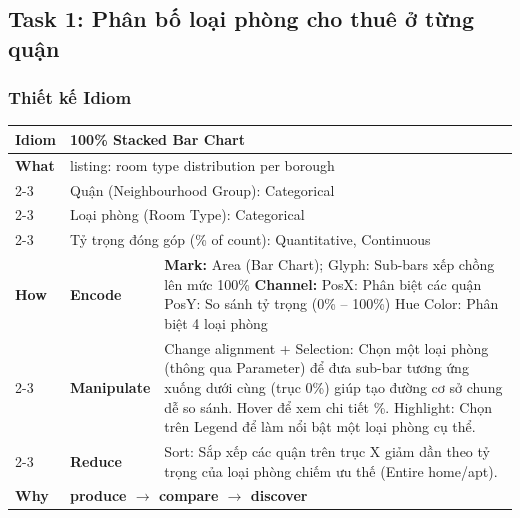\subsection{Task 1: Phân bố loại phòng cho thuê ở từng quận}

\subsubsection{Thiết kế Idiom}

\begin{table}[H]
\centering
\renewcommand{\arraystretch}{1.1}
\begin{tabularx}{\textwidth}{|l|l|X|}
\hline
\textbf{Idiom} & \multicolumn{2}{l|}{\textbf{100\% Stacked Bar Chart}} \\ \hline
\textbf{What}
& \multicolumn{2}{X|}{listing: room type distribution per borough} \\ \cline{2-3}
& \multicolumn{2}{X|}{Quận (Neighbourhood Group): Categorical} \\ \cline{2-3}
& \multicolumn{2}{X|}{Loại phòng (Room Type): Categorical} \\ \cline{2-3}
& \multicolumn{2}{X|}{Tỷ trọng đóng góp (\% of count): Quantitative, Continuous} \\ \hline
\textbf{How}
& \textbf{Encode} &
\textbf{Mark:} Area (Bar Chart); Glyph: Sub-bars xếp chồng lên mức 100\% \newline
\textbf{Channel:} \newline
\hspace*{1em} PosX: Phân biệt các quận \newline
\hspace*{1em} PosY: So sánh tỷ trọng (0\% -- 100\%) \newline
\hspace*{1em} Hue Color: Phân biệt 4 loại phòng \\ \cline{2-3}
& \textbf{Manipulate} &
Change alignment + Selection: Chọn một loại phòng (thông qua Parameter) để đưa sub-bar tương ứng xuống dưới cùng (trục 0\%) giúp tạo đường cơ sở chung dễ so sánh. Hover để xem chi tiết \%. \newline
Highlight: Chọn trên Legend để làm nổi bật một loại phòng cụ thể. \\ \cline{2-3}
& \textbf{Reduce} &
Sort: Sắp xếp các quận trên trục X giảm dần theo tỷ trọng của loại phòng chiếm ưu thế (Entire home/apt). \\ \hline
\textbf{Why} & \multicolumn{2}{X|}{
\textbf{produce $\rightarrow$ compare $\rightarrow$ discover} \newline
}
\end{tabularx}
\end{table}
